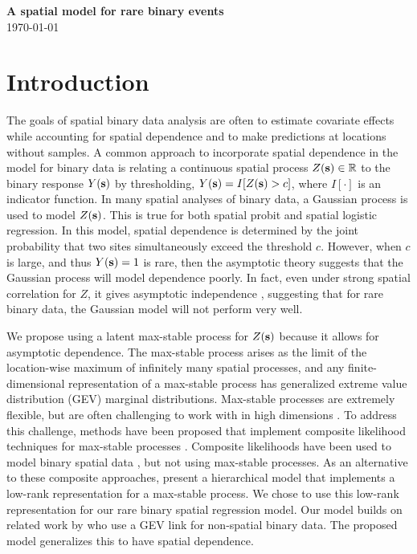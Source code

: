 \documentclass[11pt]{article}
\begin{document}
\linenumbers

\begin{center}
{\Large {\bf A spatial model for rare binary events}}\\
\today
\end{center}

\section{Introduction}\label{rbs:intro}

The goals of spatial binary data analysis are often to estimate covariate effects while accounting for spatial dependence and to make predictions at locations without samples.
A common approach to incorporate spatial dependence in the model for binary data is relating a continuous spatial process $Z(\mbox{\bf s}) \in \mathbb{R}$ to the binary response $Y(\mbox{\bf s})$ by thresholding, $Y(\mbox{\bf s}) = I[Z(\mbox{\bf s}) > c]$, where $I[\cdot]$ is an indicator function.
In many spatial analyses of binary data, a Gaussian process is used to model $Z(\mbox{\bf s})$.
This is true for both spatial probit and spatial logistic regression.
In this model, spatial dependence is determined by the joint probability that two sites simultaneously exceed the threshold $c$.
However, when $c$ is large, and thus $Y(\mbox{\bf s}) = 1$ is rare, then the asymptotic theory suggests that the Gaussian process will model dependence poorly.
In fact, even under strong spatial correlation for $Z$, it gives asymptotic independence \citep{Sibuya1960}, suggesting that for rare binary data, the Gaussian model will not perform very well.

We propose using a latent max-stable process \citep{deHaan1984} for $Z(\mbox{\bf s})$ because it allows for asymptotic dependence.
The max-stable process arises as the limit of the location-wise maximum of infinitely many spatial processes, and any finite-dimensional representation of a max-stable process has generalized extreme value distribution (GEV) marginal distributions.
Max-stable processes are extremely flexible, but are often challenging to work with in high dimensions \citep{Wadsworth2014,Thibaud2013a}.
To address this challenge, methods have been proposed that implement composite likelihood techniques for max-stable processes \citep{Padoan2010,Genton2011,Huser2014}.
Composite likelihoods have been used to model binary spatial data \citep{Heagerty1998}, but not using max-stable processes.
As an alternative to these composite approaches, \citet{Reich2012} present a hierarchical model that implements a low-rank representation for a max-stable process.
We chose to use this low-rank representation for our rare binary spatial regression model.
Our model builds on related work by \citet{Wang2010} who use a GEV link for non-spatial binary data.
The proposed model generalizes this to have spatial dependence.
\end{document}
